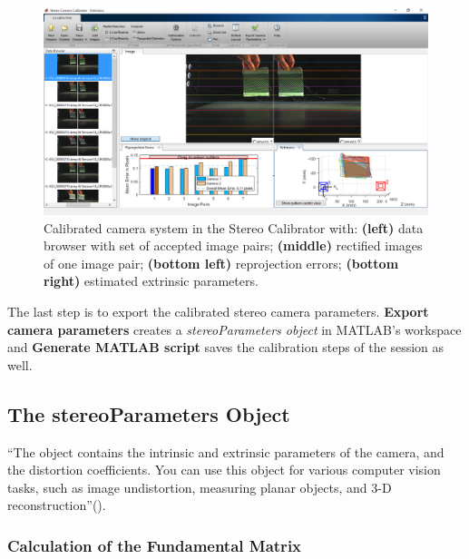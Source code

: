 \begin{figure}[htbp]
		\centering
		\includegraphics[width=1.0\textwidth]{figures/ExRectified}
		\caption[Calibrated camera system in Matlab]{Calibrated camera system in the Stereo Calibrator with: \textbf{(left)} data browser with set of accepted image pairs; \textbf{(middle)} rectified images of one image pair; \textbf{(bottom left)} reprojection errors; \textbf{(bottom right)} estimated extrinsic parameters.}
		\label{fig:ExRectified}
\end{figure}

The last step is to export the calibrated stereo camera parameters. \textbf{Export camera parameters} creates a \textit{stereoParameters object} in MATLAB's workspace and \textbf{Generate MATLAB script} saves the calibration steps of the session as well.

\subsection{The stereoParameters Object}\label{ssec:stereoParamsObj}
\enquote{The object contains the intrinsic and extrinsic parameters of the camera, and the distortion coefficients. You can use this object for various computer vision tasks, such as image undistortion, measuring planar objects, and 3-D reconstruction}(\cite{StereoCalib.2016}).

\subsubsection{Calculation of the Fundamental Matrix}
